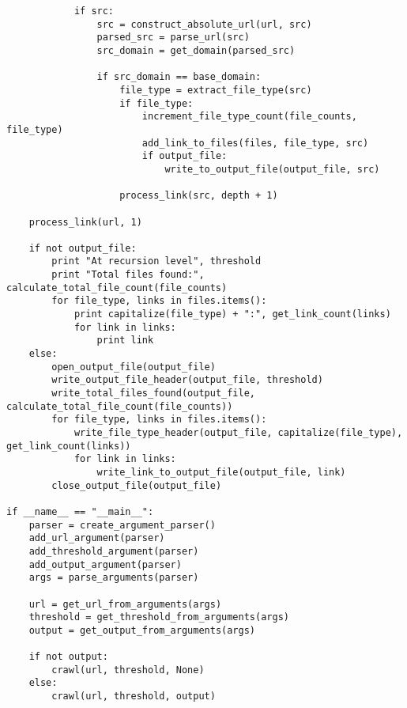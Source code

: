 \documentclass{article}
\begin{document}
\begin{verbatim}
            if src:
                src = construct_absolute_url(url, src)
                parsed_src = parse_url(src)
                src_domain = get_domain(parsed_src)
                
                if src_domain == base_domain:
                    file_type = extract_file_type(src)
                    if file_type:
                        increment_file_type_count(file_counts, file_type)
                        add_link_to_files(files, file_type, src)
                        if output_file:
                            write_to_output_file(output_file, src)
                    
                    process_link(src, depth + 1)
    
    process_link(url, 1)
    
    if not output_file:
        print "At recursion level", threshold
        print "Total files found:", calculate_total_file_count(file_counts)
        for file_type, links in files.items():
            print capitalize(file_type) + ":", get_link_count(links)
            for link in links:
                print link
    else:
        open_output_file(output_file)
        write_output_file_header(output_file, threshold)
        write_total_files_found(output_file, calculate_total_file_count(file_counts))
        for file_type, links in files.items():
            write_file_type_header(output_file, capitalize(file_type), get_link_count(links))
            for link in links:
                write_link_to_output_file(output_file, link)
        close_output_file(output_file)

if __name__ == "__main__":
    parser = create_argument_parser()
    add_url_argument(parser)
    add_threshold_argument(parser)
    add_output_argument(parser)
    args = parse_arguments(parser)
    
    url = get_url_from_arguments(args)
    threshold = get_threshold_from_arguments(args)
    output = get_output_from_arguments(args)
    
    if not output:
        crawl(url, threshold, None)
    else:
        crawl(url, threshold, output)

\end{verbatim}



\end{document}

